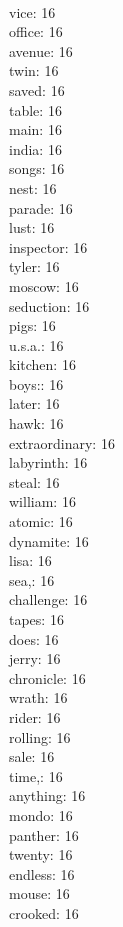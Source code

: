 \begin{multicols}{6}
  \\ vice: 16
  \\ office: 16
  \\ avenue: 16
  \\ twin: 16
  \\ saved: 16
  \\ table: 16
  \\ main: 16
  \\ india: 16
  \\ songs: 16
  \\ nest: 16
  \\ parade: 16
  \\ lust: 16
  \\ inspector: 16
  \\ tyler: 16
  \\ moscow: 16
  \\ seduction: 16
  \\ pigs: 16
  \\ u.s.a.: 16
  \\ kitchen: 16
  \\ boys:: 16
  \\ later: 16
  \\ hawk: 16
  \\ extraordinary: 16
  \\ labyrinth: 16
  \\ steal: 16
  \\ william: 16
  \\ atomic: 16
  \\ dynamite: 16
  \\ lisa: 16
  \\ sea,: 16
  \\ challenge: 16
  \\ tapes: 16
  \\ does: 16
  \\ jerry: 16
  \\ chronicle: 16
  \\ wrath: 16
  \\ rider: 16
  \\ rolling: 16
  \\ sale: 16
  \\ time,: 16
  \\ anything: 16
  \\ mondo: 16
  \\ panther: 16
  \\ twenty: 16
  \\ endless: 16
  \\ mouse: 16
  \\ crooked: 16

\end{multicols}
